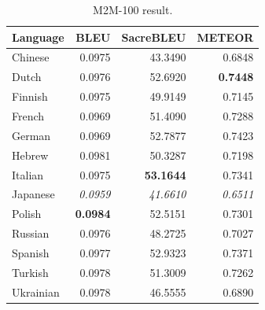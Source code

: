 \documentclass[a4paper]{article}
\begin{document}
\begin{table}[htbp]
\begin{minipage}{0.49\linewidth}
\begin{tabular}{|l|r|r|r|}
            \hline
            \textbf{Language} & \textbf{BLEU}   & \textbf{SacreBLEU} & \textbf{METEOR} \\
            \hline
            Chinese           & 0.0975          & 43.3490            & 0.6848          \\
            Dutch             & 0.0976          & 52.6920            & \textbf{0.7448} \\
            Finnish           & 0.0975          & 49.9149            & 0.7145          \\
            French            & 0.0969          & 51.4090            & 0.7288          \\
            German            & 0.0969          & 52.7877            & 0.7423          \\
            Hebrew            & 0.0981          & 50.3287            & 0.7198          \\
            Italian           & 0.0975          & \textbf{53.1644}   & 0.7341          \\
            Japanese          & \textit{0.0959} & \textit{41.6610}   & \textit{0.6511} \\
            Polish            & \textbf{0.0984} & 52.5151            & 0.7301          \\
            Russian           & 0.0976          & 48.2725            & 0.7027          \\
            Spanish           & 0.0977          & 52.9323            & 0.7371          \\
            Turkish           & 0.0978          & 51.3009            & 0.7262          \\
            Ukrainian         & 0.0978          & 46.5555            & 0.6890          \\
            \hline
        \end{tabular}
        \caption{M2M-100 result.}
        \label{table:m2m_result}
    \end{minipage}
\end{table}
\end{document}
